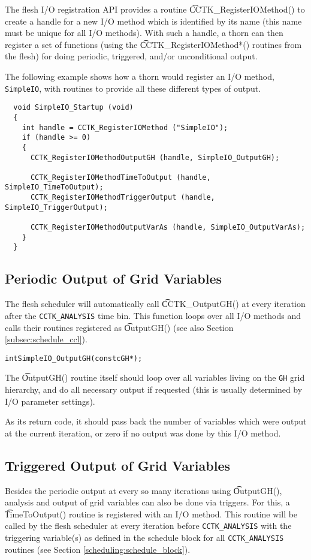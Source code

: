 The flesh I/O registration API provides a routine {\t CCTK\_RegisterIOMethod()}
to create a handle for a new I/O method which is identified by its name
(this name must be unique for all I/O methods).
With such a handle, a thorn can then register a set of functions (using the
{\t CCTK\_RegisterIOMethod*()} routines from the flesh) for doing
periodic, triggered, and/or unconditional output.

The following example shows how a thorn would register an I/O method,
{\tt SimpleIO}, with routines to provide all these different types of output.
%
\begin{verbatim}
  void SimpleIO_Startup (void)
  {
    int handle = CCTK_RegisterIOMethod ("SimpleIO");
    if (handle >= 0)
    {
      CCTK_RegisterIOMethodOutputGH (handle, SimpleIO_OutputGH);

      CCTK_RegisterIOMethodTimeToOutput (handle, SimpleIO_TimeToOutput);
      CCTK_RegisterIOMethodTriggerOutput (handle, SimpleIO_TriggerOutput);

      CCTK_RegisterIOMethodOutputVarAs (handle, SimpleIO_OutputVarAs);
    }
  }
\end{verbatim}
%
%
\subsection{Periodic Output of Grid Variables}
%
The flesh scheduler will automatically call {\t CCTK\_OutputGH()} at every
iteration after the {\tt CCTK\_ANALYSIS} time bin. This function loops over all
I/O methods and calls their routines registered as {\t OutputGH()} (see also Section
\ref{subsec:schedule_ccl}).
%
\begin{alltt}
  int SimpleIO_OutputGH (const cGH *);
\end{alltt}
%
The {\t OutputGH()} routine itself should loop over all variables living on the
\texttt{GH} grid hierarchy, and do all necessary output if requested
(this is usually determined by I/O parameter settings).

As its return code, it should pass back the number of variables which were output
at the current iteration, or zero if no output was done by this I/O method.
%
%
\subsection{Triggered Output of Grid Variables}
%
Besides the periodic output at every so many iterations using {\t OutputGH()},
analysis and output of grid variables can also be done via triggers. For this,
a {\t TimeToOutput()} routine is registered with an I/O method.
This routine will be called by the flesh scheduler at every iteration before
{\tt CCTK\_ANALYSIS} with the triggering variable(s) as defined in the schedule
block for all {\tt CCTK\_ANALYSIS} routines (see Section \ref{scheduling:schedule_block}).

